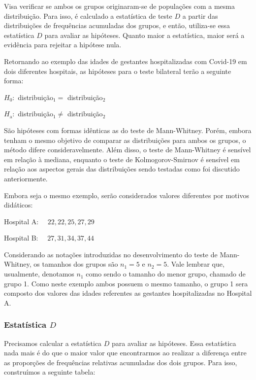 \documentclass[
  letterpaper,
  DIV=11,
  numbers=noendperiod]{scrreprt}
\begin{document}
Visa verificar se ambos os grupos originaram-se de populações com a
mesma distribuição. Para isso, é calculado a estatística de teste \(D\)
a partir das distribuições de frequências acumuladas dos grupos, e
então, utiliza-se essa estatística \(D\) para avaliar as hipóteses.
Quanto maior a estatística, maior será a evidência para rejeitar a
hipótese nula.

Retornando ao exemplo das idades de gestantes hospitalizadas com
Covid-19 em dois diferentes hospitais, as hipóteses para o teste
bilateral terão a seguinte forma:

\(H_0:\) distribuição\(_1=\) distribuição\(_2\)

\(H_{\mathrm{a}}:\) distribuição\(_1 \neq\) distribuição\({ }_2\)

São hipóteses com formas idênticas as do teste de Mann-Whitney. Porém,
embora tenham o mesmo objetivo de comparar as distribuições para ambos
os grupos, o método difere consideravelmente. Além disso, o teste de
Mann-Whitney é sensível em relação à mediana, enquanto o teste de
Kolmogorov-Smirnov é sensível em relação aos aspectos gerais das
distribuições sendo testadas como foi discutido anteriormente.

Embora seja o mesmo exemplo, serão considerados valores diferentes por
motivos didáticos:

Hospital A: \(\quad 22,22,25,27,29\)

Hospital B: \(\quad 27,31,34,37,44\)

Considerando as notações introduzidas no desenvolvimento do teste de
Mann-Whitney, os tamanhos dos grupos são \(n_1 = 5\) e \(n_2 = 5\). Vale
lembrar que, usualmente, denotamos \(n_1\) como sendo o tamanho do menor
grupo, chamado de grupo 1. Como neste exemplo ambos possuem o mesmo
tamanho, o grupo 1 sera composto dos valores das idades referentes as
gestantes hospitalizadas no Hospital A.

\hypertarget{estatuxedstica-d}{%
\subsubsection{\texorpdfstring{Estatística
\(D\)}{Estatística D}}\label{estatuxedstica-d}}

Precisamos calcular a estatística \(D\) para avaliar as hipóteses. Essa
estatística nada mais é do que o maior valor que encontrarmos ao
realizar a diferença entre as proporções de frequências relativas
acumuladas dos dois grupos. Para isso, construímos a seguinte tabela:
\end{document}
